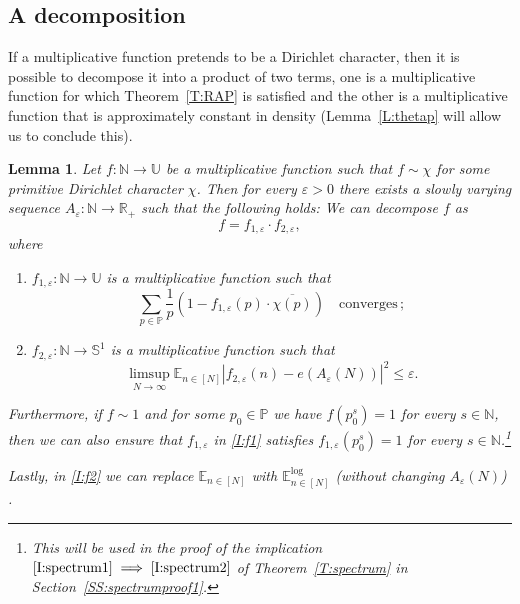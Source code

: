 \documentclass[11pt]{amsart}
\newtheorem{lemma}{Lemma}[section]
\theoremstyle{definition}
\newcommand{\lE}{\mathbb{E}^{\log}}
\newcommand{\E}{{\mathbb E}}
\newcommand{\N}{{\mathbb N}}
\renewcommand{\P}{{\mathbb P}}
\newcommand{\R}{{\mathbb R}}
\renewcommand{\S}{\mathbb{S}}
\newcommand{\U}{{\mathbb U}}
\begin{document}
	 \subsection{A decomposition}
	If a multiplicative function pretends to be a Dirichlet character, then  it is possible to decompose it into a product
	  of two terms, one is a multiplicative function for which Theorem~\ref{T:RAP} is satisfied and the other is a multiplicative function that   is approximately constant in density (Lemma~\ref{L:thetap} will allow us to conclude this).
	 \begin{lemma}\label{L:12e}
	 	Let $f\colon \N\to \U$ be a  multiplicative function such that $f\sim \chi$ for some primitive Dirichlet character $\chi$. Then  for every $\varepsilon>0$   there exists a slowly varying sequence $A_\varepsilon\colon \N\to \R_+$  such that the following holds: We can decompose $f$ as
	 	\begin{equation}\label{E:f12}
	 	f=f_{1,\varepsilon}\cdot f_{2,\varepsilon},
	 	\end{equation}
	 	where
	 	\begin{enumerate}
	 		\item\label{I:f1}
	 	 $f_{1,\varepsilon}\colon \N\to \U$ is a multiplicative function such that
	 	\begin{equation}\label{E:1-f}
	 	\sum_{p\in \P}\frac{1}{p}(1-f_{1,\varepsilon }(p)\cdot \overline{\chi(p)})\quad  \text{converges}  \, ;
	 	\end{equation}
\item\label{I:f2} $f_{2,\varepsilon}\colon \N\to \S^1$  is a multiplicative function 	such that
\begin{equation}\label{E:aNe}
	\limsup_{N\to\infty}\E_{n\in [N]}|f_{2,\varepsilon}(n)-e(A_\varepsilon(N))|^2\leq \varepsilon.
\end{equation}
	 	\end{enumerate}
  Furthermore, 	if  $f\sim 1$ and for some $p_0\in \P$ we have $f(p_0^s)=1$ for every $s\in \N$, then  we can also ensure that $f_{1,\varepsilon}$  in \eqref{I:f1} satisfies $f_{1,\varepsilon}(p_0^s)=1$ for every $s\in \N$.\footnote{This will be used  in the proof of the implication $\eqref{I:spectrum1}\implies \eqref{I:spectrum2}$ of Theorem~\ref{T:spectrum} in Section~\ref{SS:spectrumproof1}.}
 	
 Lastly,  in \eqref{I:f2} we can replace $\E_{n\in [N]}$ with $\lE_{n\in [N]}$ (without changing $A_\varepsilon(N)$) .
	 \end{lemma}
\end{document}
